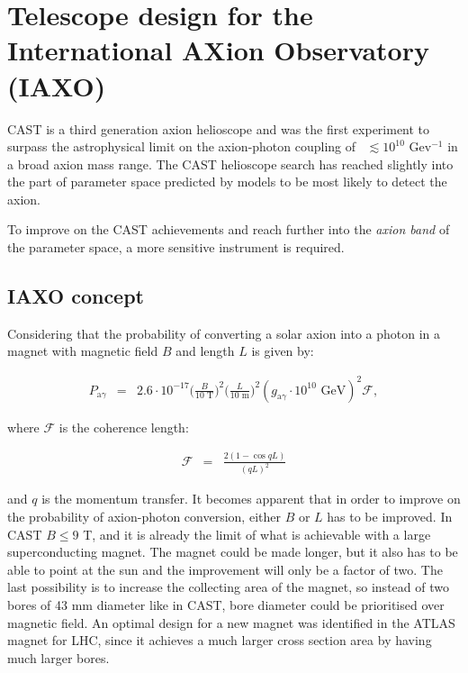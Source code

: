 \chapter{Telescope design for the International AXion Observatory (IAXO)}\label{chap:iaxo}
CAST is a third generation axion helioscope and was the first experiment to surpass the astrophysical limit on the axion-photon coupling of \gay\ $\lesssim 10^{10}$ Gev$^{-1}$ in a broad axion mass range. The CAST helioscope search has reached slightly into the part of parameter space predicted by models to be most likely to detect the axion.

To improve on the CAST achievements and reach further into the \emph{axion band} of the parameter space, a more sensitive instrument is required.

\section{IAXO concept}
Considering that the probability of converting a solar axion into a photon in a magnet with magnetic field $B$ and length $L$ is given by\cite{Andriamonje:2007jc,Zioutas:2005jl,Sikivie:1983wx}:

\begin{eqnarray}
  P_{\text{a}\gamma} &=& 2.6\cdot10^{-17}\bigg(\frac{B}{10\text{ T}}\bigg)^2\bigg(\frac{L}{10\text{ m}}\bigg)^2(g_{\text{a}\gamma}\cdot10^{10}\text{\ GeV})^2\mathcal{F},
\end{eqnarray}

where $\mathcal{F}$ is the coherence length:

\begin{eqnarray}
  \mathcal{F} &=& \frac{2(1-\cos{qL})}{(qL)^2}
\end{eqnarray}

and $q$ is the momentum transfer. It becomes apparent that in order to improve on the probability of axion-photon conversion, either $B$ or $L$ has to be improved. In CAST $B \leq 9$ T, and it is already the limit of what is achievable with a large superconducting magnet. The magnet could be made longer, but it also has to be able to point at the sun and the improvement will only be a factor of two. The last possibility is to increase the collecting area of the magnet, so instead of two bores of 43 mm diameter like in CAST, bore diameter could be prioritised over magnetic field. An optimal design for a new magnet was identified\cite{Irastorza:1340820} in the ATLAS magnet for LHC\cite{Collaboration:1997vu}, since it achieves a much larger cross section area by having much larger bores.

